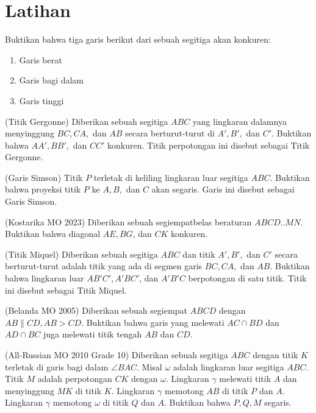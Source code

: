 \documentclass[11pt]{scrartcl}
\begin{document}
\section{Latihan}
\begin{problem}
    Buktikan bahwa tiga garis berikut dari sebuah segitiga akan konkuren:
    \begin{enumerate}
        \item Garis berat
        \item Garis bagi dalam
        \item Garis tinggi
        
    \end{enumerate}
\end{problem}

\begin{problem}
    (Titik Gergonne) Diberikan sebuah segitiga $ABC$ yang lingkaran dalamnya menyinggung $BC, CA,$ dan $AB$ secara berturut-turut di $A', B',$ dan $C'$. Buktikan bahwa $AA', BB',$ dan $CC'$ konkuren. Titik perpotongan ini disebut sebagai Titik Gergonne.
\end{problem}

\begin{problem}
    (Garis Simson) Titik $P$ terletak di keliling lingkaran luar segitiga $ABC$. Buktikan bahwa proyeksi titik $P$ ke $A, B,$ dan $C$ akan segaris. Garis ini disebut sebagai Garis Simson.
\end{problem}

\begin{problem}
    (Kostarika MO 2023) Diberikan sebuah segiempatbelas beraturan $ABCD..MN$. Buktikan bahwa diagonal $AE, BG$, dan $CK$ konkuren.
\end{problem}

\begin{problem}
    (Titik Miquel) Diberikan sebuah segitiga $ABC$ dan titik $A', B',$ dan $C'$ secara berturut-turut adalah titik yang ada di segmen garis $BC, CA,$ dan $AB$. Buktikan bahwa lingkaran luar $AB'C', A'BC'$, dan $A'B'C$ berpotongan di satu titik. Titik ini disebut sebagai Titik Miquel.
\end{problem}

\begin{problem}
    (Belanda MO 2005) Diberikan sebuah segiempat $ABCD$ dengan $AB \parallel CD, AB > CD$. Buktikan bahwa garis yang melewati $AC\cap BD$ dan $AD \cap BC$ juga melewati titik tengah $AB$ dan $CD$.
\end{problem}

\begin{problem}
    (All-Russian MO 2010 Grade 10) Diberikan sebuah segitiga $ABC$ dengan titik $K$ terletak di garis bagi dalam $\angle BAC$. Misal $\omega$ adalah lingkaran luar segitiga $ABC$. Titik $M$ adalah perpotongan $CK$ dengan $\omega$. Lingkaran $\gamma$ melewati titik $A$ dan menyinggung $MK$ di titik $K$. Lingkaran $\gamma$ memotong $AB$ di titik $P$ dan $A$. Lingkaran $\gamma$ memotong $\omega$ di titik $Q$ dan $A$. Buktikan bahwa $P, Q, M$ segaris.
\end{problem}
\end{document}
